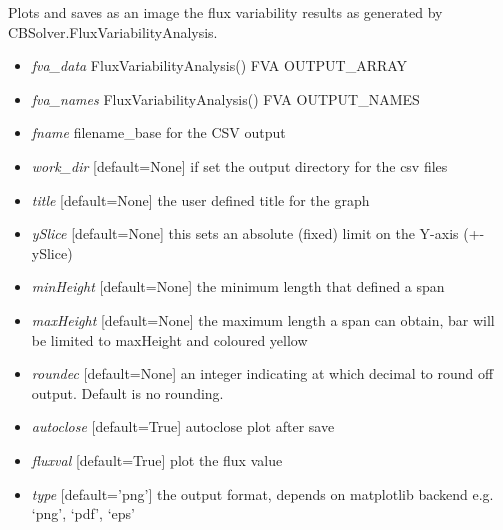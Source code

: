\documentclass[a4paper,11pt,english]{sphinxmanual}
\begin{document}
\begin{fulllineitems}
\label{modules_doc:cbmpy.CBPlot.plotFluxVariability}
Plots and saves as an image the flux variability results as generated by CBSolver.FluxVariabilityAnalysis.
\begin{itemize}
\item {} 
\emph{fva\_data} FluxVariabilityAnalysis() FVA OUTPUT\_ARRAY

\item {} 
\emph{fva\_names} FluxVariabilityAnalysis() FVA OUTPUT\_NAMES

\item {} 
\emph{fname} filename\_base for the CSV output

\item {} 
\emph{work\_dir} {[}default=None{]} if set the output directory for the csv files

\item {} 
\emph{title} {[}default=None{]} the user defined title for the graph

\item {} 
\emph{ySlice} {[}default=None{]} this sets an absolute (fixed) limit on the Y-axis (+- ySlice)

\item {} 
\emph{minHeight} {[}default=None{]} the minimum length that defined a span

\item {} 
\emph{maxHeight} {[}default=None{]} the maximum length a span can obtain, bar will be limited to maxHeight and coloured yellow

\item {} 
\emph{roundec} {[}default=None{]} an integer indicating at which decimal to round off output. Default is no rounding.

\item {} 
\emph{autoclose} {[}default=True{]} autoclose plot after save

\item {} 
\emph{fluxval} {[}default=True{]} plot the flux value

\item {} 
\emph{type} {[}default='png'{]} the output format, depends on matplotlib backend e.g. `png', `pdf', `eps'

\end{itemize}

\end{fulllineitems}
\end{document}
